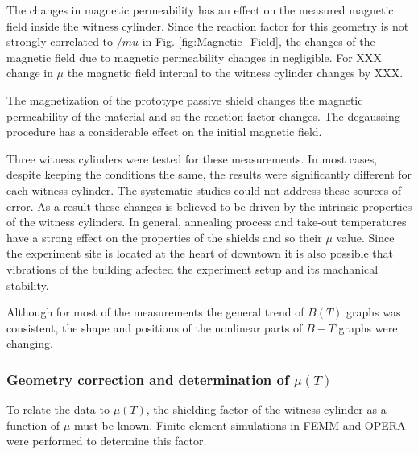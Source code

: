 The changes in magnetic permeability has an effect on the measured
magnetic field inside the witness cylinder. Since the reaction factor
for this geometry is not strongly correlated to $/mu$ in
Fig. \ref{fig:Magnetic_Field}, the changes of the magnetic field due
to magnetic permeability changes in negligible. For XXX change in
$\mu$ the magnetic field internal to the witness cylinder changes by
XXX.

The magnetization of the prototype passive shield changes the magnetic
permeability of the material and so the reaction factor changes. The
degaussing procedure has a considerable effect on the initial magnetic
field.

Three witness cylinders were tested for these measurements. In most
cases, despite keeping the conditions the same, the results were
significantly different for each witness cylinder. The systematic
studies could not address these sources of error. As a result these
changes is believed to be driven by the intrinsic properties of the
witness cylinders.  In general, annealing process and take-out
temperatures have a strong effect on the properties of the shields and
so their $\mu$ value.
Since the experiment site is located at the heart of downtown it is
also possible that vibrations of the building affected the experiment
setup and its machanical stability.

Although for most of the measurements the general trend of $B(T)$
graphs was consistent, the shape and positions of the nonlinear parts
of $B-T$ graphs were changing.







\subsubsection{Geometry correction and determination of $\mu(T)$}

To relate the data to $\mu(T)$, the shielding factor of the witness
cylinder as a function of $\mu$ must be known.  Finite element
simulations in FEMM and OPERA were performed to determine this factor.

